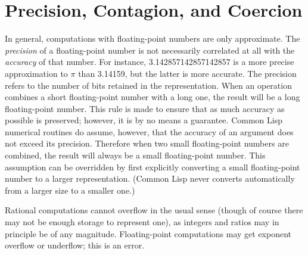 \section{Precision, Contagion, and Coercion}
\label{PRECISION-CONTAGION-COERCION-SECTION}

In general,
computations with floating-point numbers are only approximate.
The {\it precision} of a floating-point number is not necessarily
correlated at all with the {\it accuracy} of that number.
For instance, 3.142857142857142857 is a more precise approximation
to $\pi$ than 3.14159, but the latter is more accurate.
The precision refers to the number of bits retained in the representation.
When an operation combines a short floating-point number with a long one,
the result will be a long floating-point number.  This rule is made
to ensure that as much accuracy as possible is preserved; however,
it is by no means a guarantee.
Common Lisp numerical routines do assume, however, that the accuracy of
an argument does not exceed its precision.  Therefore
when two small floating-point numbers
are combined, the result will always be a small floating-point number.
This assumption can be overridden by first explicitly converting
a small floating-point number to a larger representation.
(Common Lisp never converts automatically from a larger size to a smaller one.)

Rational computations cannot overflow in the usual sense
(though of course there may not be enough storage
to represent one), as integers and ratios may in principle be of any magnitude.
Floating-point computations may get exponent overflow or underflow;
this is an error.


